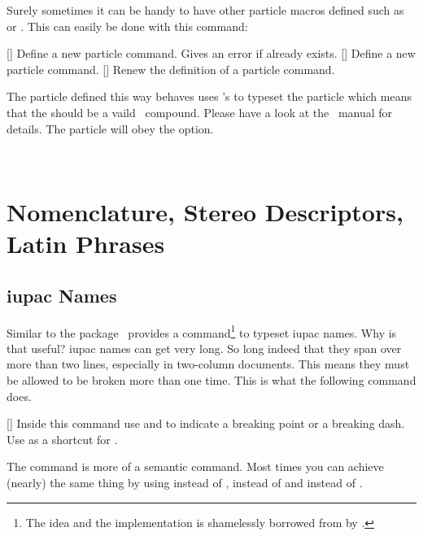 \documentclass[load-preamble+]{cnltx-doc}
\begin{document}
Surely sometimes it can be handy to have other particle macros defined such as
 or .  This can easily be done with this command:
\begin{commands}
  []
    Define a new particle command.  Gives an error if
     already exists.
  []
    Define a new particle command.
  []
    Renew the definition of a particle command.
\end{commands}
The particle defined this way behaves uses \chemformula's  to typeset
the particle which means that the  should be a vaild
\chemformula\ compound.  Please have a look at the \chemformula\ manual for
details.  The particle will obey the  option.
\begin{example}
  \NewChemParticle\positron{\chembeta+}
  \NewChemParticle\photon{\chemgamma}
  \RenewChemParticle\el{\chembeta-}
  \positron\ \photon\ \el
\end{example}

\section{Nomenclature, Stereo Descriptors, Latin Phrases}\label{sec:stereo}
\subsection{\acs{iupac} Names}

Similar to the  package \chemmacros\ provides a
command\footnote{The idea and the implementation is shamelessly borrowed from
   by \pedersen.} to typeset \ac{iupac} names.  Why is
that useful?  \ac{iupac} names can get very long.  So long indeed that they
span over more than two lines, especially in two-column documents.  This means
they must be allowed to be broken more than one time.  This is what the
following command does.
\begin{commands}
  []
    Inside this command use \cs{\textbar} and \cs{-} to indicate a breaking
    point or a breaking dash.  Use \cs{\textasciicircum} as a shortcut for
    .
\end{commands}

\begin{example}
  \begin{minipage}{.4\linewidth}
  \end{minipage}
\end{example}
The  command is more of a semantic command.  Most times you can
achieve (nearly) the same thing by using \cs{-} instead of \cs{\textbar},
\code{-} instead of \cs{-} and  instead of
\cs{\textasciicircum}.
\end{document}
